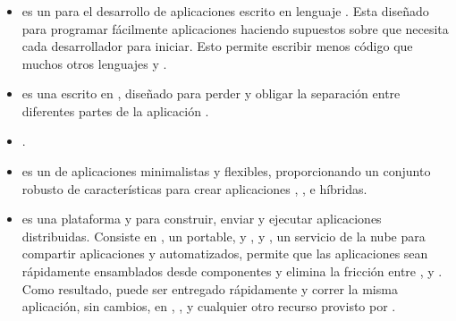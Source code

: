 \subsubsection{\frameworksPC}
	\begin{itemize}
		\item \textbf{\rubyonrailsNAME} es un \frameworkPC para el desarrollo de aplicaciones \webINT escrito en lenguaje \rubyNAME. Esta diseñado para programar fácilmente aplicaciones \webINT haciendo supuestos sobre que necesita cada desarrollador para iniciar. Esto permite escribir menos código que muchos otros lenguajes y \frameworksPC \cite{online_technology_rubyonrails}.
		
		\item \textbf{\djangoNAME} es una \frameworkPC \openSourcePC escrito en \pythonNAME, diseñado para perder \couplingAS y obligar la separación entre diferentes partes de la aplicación \cite{online_book_django_developmentpattern}.
		
		\item \textbf{\meteor}.

		\item \textbf{\expressjsNAME} es un \frameworkPC de aplicaciones \webINT \nodejsNAME minimalistas y flexibles, proporcionando un conjunto robusto de características  para crear aplicaciones \webINT \single, \multipage, e híbridas.
	
		\item \textbf{\docker} es una plataforma \openSourcePC y \sysadmins para construir, enviar y ejecutar aplicaciones distribuidas. Consiste en \docker \engine, un portable, \lightweightPL \runtime y \packaging \tool, y \docker \hub, un servicio de la nube para compartir aplicaciones y \workflows automatizados, \docker permite que las aplicaciones sean rápidamente ensamblados desde componentes y elimina la fricción entre \development, \qaSIGLA y \production \environments. Como resultado, puede ser entregado rápidamente y correr la misma aplicación, sin cambios, en \laptops, \dataPC \centerCustom \vmsSIGLA, y cualquier otro recurso provisto por \internet \cite{technology_docker}.
	\end{itemize}

